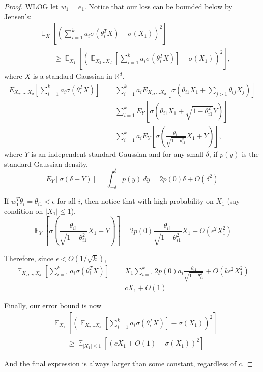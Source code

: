 \documentclass{article}
\newcommand{\R}{{\mathbb{R}}}
\DeclareMathOperator*{\expt}{\mathbb{E}}
\newcommand{\EE}[2]{{\expt_{#1}{#2}}}
\begin{document}
\begin{proof}
WLOG let $w_1 = e_1$. Notice that our loss can be bounded below by Jensen's:
%
\begin{align*}
& \expt_X \left[ \left( \sum_{i=1}^k a_i \sigma(\theta_i^TX) - \sigma(X_1)\right)^2 \right] \\
& \qquad 
\geq \expt_{X_1} \left[ \left( \EE{X_2...X_d}{\left[ \sum_{i=1}^k a_i \sigma(\theta_i^TX) \right]}- \sigma(X_1)\right)^2 \right],
\end{align*}
where $X$ is a standard Gaussian in $\R^d$. 
%
\begin{align*}
E_{X_2,..,X_d} \left[  \sum_{i=1}^k a_i \sigma(\theta_i^TX) \right] &= \sum_{i=1}^k a_i E_{X_2,...X_d}\left[  \sigma(\theta_{i1}X_1 + \sum_{j >1} \theta_{ij}X_{j})  \right]\\
&= \sum_{i=1}^k E_{Y} \left[   \sigma(\theta_{i1}X_1 + \sqrt{1-\theta_{i1}^2}Y)  \right]  \\
&= \sum_{i=1}^k a_i E_{Y} \left[   \sigma(\textstyle\frac{\theta_{i1}}{\sqrt{1-\theta_{i1}^2}}X_1 + Y)  \right] ,
\end{align*}
where $Y$ is an independent standard Gaussian and for any small $\delta$, if $p(y)$ is the standard Gaussian density, 
%
\[ E_Y[\sigma(\delta + Y)] = \int_{-\delta}^{\delta} p(y) \, dy = 2p(0)\delta + O(\delta^2) \]

If $w_1^T\theta_i = \theta_{i1} < \epsilon$ for all $i$, then notice that with high probability on $X_1$ (say condition on $|X_1| \leq 1$), 
%
\[\expt_{Y} \left[   \sigma(\textstyle\frac{\theta_{i1}}{\sqrt{1-\theta_{i1}^2}}X_1 + Y)  \right] = 2p(0)\textstyle\frac{\theta_{i1}}{\sqrt{1-\theta_{i1}^2}}X_1 + O(\epsilon^2X_1^2)\]

Therefore, since $\epsilon < O(1/\sqrt{k})$,
%
\begin{align*}
\expt_{X_2,..,X_d} \left[  \sum_{i=1}^k a_i \sigma(\theta_i^TX)
  \right]  & = X_1
  \sum_{i=1}^k2p(0)a_i\textstyle\frac{\theta_{i1}}{\sqrt{1-\theta_{i1}^2}}
  + O(k\epsilon^2X_1^2) \\
& = cX_1+O(1)
\end{align*}


Finally, our error bound is now
%
\begin{align*}
& \expt_{X_1} \left[ \left( \expt_{X_2...X_d}\left[ \sum_{i=1}^k a_i
      \sigma(\theta_i^TX) \right]- \sigma(X_1)\right)^2 \right] \\
& \qquad \geq
\expt_{|X_1| \leq 1}[(cX_1+O(1) - \sigma(X_1))^2]
\end{align*}

And the final expression is always larger than some constant, regardless of $c$.
\end{proof}
\end{document}
